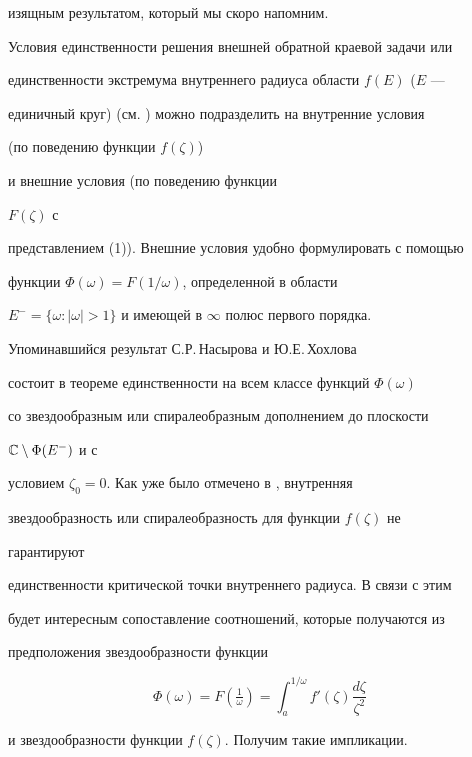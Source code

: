 изящным результатом, который мы скоро напомним.





Условия единственности решения внешней обратной краевой задачи или


единственности экстремума внутреннего радиуса области $f(E)$ ($E$ ---


единичный круг) (см. \cite{1}) можно подразделить на внутренние условия


(по поведению функции $f(\zeta)$)


и внешние условия (по поведению функции


$F(\zeta)$ с


представлением (1)). Внешние условия удобно формулировать с помощью


функции $\Phi(\omega)=F(1/\omega)$, определенной в области


$E^-=\{\omega:|\omega|>1\}$ и имеющей в $\infty$ полюс первого порядка.





Упоминавшийся результат С.Р.\,Насырова и Ю.Е.\,Хохлова \cite{7}


состоит в теореме единственности на всем классе функций $\Phi(\omega)$


со звездообразным или спиралеобразным дополнением до плоскости


$\Bbb C\setminus\Phi(E^-)$ и с


условием $\zeta_0=0$. Как уже было отмечено в \cite{1}, внутренняя


звездообразность или спиралеобразность для функции $f(\zeta)$ не


гарантируют


единственности критической точки внутреннего радиуса. В связи с этим


будет интересным сопоставление соотношений, которые получаются из


предположения звездообразности функции


\begin{equation}


\Phi(\omega)=F\left(\tfrac{1}{\omega}\right)=


\int^{1/\omega}_a f'(\zeta)\frac{d\zeta}{\zeta^2}


\end{equation}


и звездообразности функции $f(\zeta)$. Получим такие импликации.





